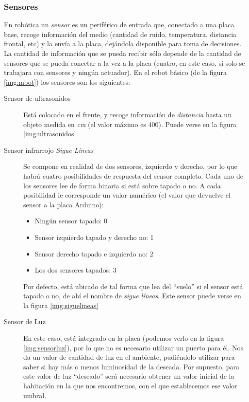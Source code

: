 \subsubsection{Sensores}\label{ssubsec:sensores}
En robótica un \textit{sensor} es un periférico de entrada que, conectado a una placa base, recoge información del medio (cantidad de ruido, temperatura, distancia frontal, etc) y la envía a la placa, dejándola disponible para toma de decisiones. La cantidad de información que se pueda recibir sólo depende de la cantidad de sensores que se pueda conectar a la vez a la placa (cuatro, en este caso, si solo se trabajara con sensores y ningún actuador). En el robot básico (de la figura \ref{img:mbot}) los sensores son los siguientes:
\begin{description}
	\item [Sensor de ultrasonidos] Está colocado en el frente, y recoge información de \textit{distancia} hasta un objeto medida en \textit{cm} (el valor máximo es 400). Puede verse en la figura \ref{img:ultrasonidos}
	
	\item [Sensor infrarrojo \textit{Sigue Líneas}] Se compone en realidad de dos sensores, izquierdo y derecho, por lo que habrá cuatro posibilidades de respuesta del sensor completo. Cada uno de los sensores lee de forma binaria si está sobre tapado o no. A cada posibilidad le corresponde un valor numérico (el valor que devuelve el sensor a la placa Arduino):
	\begin{itemize}
		\item Ningún sensor tapado: 0
		\item Sensor izquierdo tapado y derecho no: 1
		\item Sensor derecho tapado e izquierdo no: 2
		\item Los dos sensores tapados: 3
	\end{itemize}
	Por defecto, está ubicado de tal forma que lea del ``suelo'' si el sensor está tapado o no, de ahí el nombre de \textit{sigue líneas}. Este sensor puede verse en la figura \ref{img:siguelineas}
	
	\item [Sensor de Luz] En este caso, está integrado en la placa (podemos verlo en la figura \ref{img:sensorluz}), por lo que no es necesario utilizar un puerto para él. Nos da un valor de cantidad de luz en el ambiente, pudiéndolo utilizar para saber si hay más o menos luminosidad de la deseada. Por supuesto, para este valor de luz ``deseado'' será necesario obtener un valor inicial de la habitación en la que nos encontremos, con el que establecemos ese valor umbral.
\end{description}
